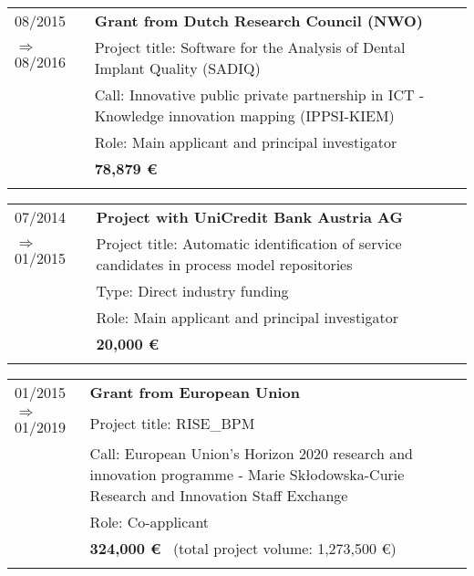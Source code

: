 \begin{tabular}{P{3cm}P{12cm}}
08/2015															& \textbf{Grant from Dutch Research Council (NWO)} \\
\hspace*{0.4cm} $\Rightarrow$ 08/2016 		& Project title: Software for the Analysis of Dental Implant Quality (SADIQ) \\
																		& Call: Innovative public private partnership in ICT - Knowledge innovation mapping (IPPSI-KIEM) \\
																		& Role: Main applicant and principal investigator \\\noalign{\smallskip}
																		& \textbf{78,879  \euro} \\
																		& \\
																		\end{tabular}														
\begin{tabular}{P{3cm}P{12cm}}		
07/2014															& \textbf{Project with UniCredit Bank Austria AG} \\
\hspace*{0.4cm} $\Rightarrow$ 01/2015 		& Project title: Automatic identification of service candidates in process model repositories	 \\
																		& Type: Direct industry funding \\
																		& Role: Main applicant and principal investigator \\\noalign{\smallskip}
																		& \textbf{20,000  \euro} \\
																		& \\
																		\end{tabular}														
\begin{tabular}{P{3cm}P{12cm}}		
01/2015															& \textbf{Grant from European Union} \\
\hspace*{0.4cm} $\Rightarrow$ 01/2019 		& Project title: RISE\_BPM  \\
																		& Call: European Union's Horizon 2020 research and innovation programme - Marie Skłodowska-Curie Research and Innovation Staff Exchange\\
																		& Role: Co-applicant \\\noalign{\smallskip}
																		& \textbf{324,000  \euro} \ (total project volume: 1,273,500 \euro) \\
																		& \\
																		\end{tabular}														

